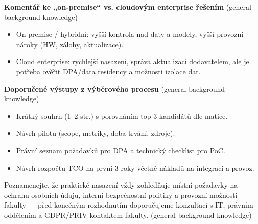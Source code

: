 \bigskip

\textbf{Komentář ke „on‑premise“ vs. cloudovým enterprise řešením} (general background knowledge)
\begin{itemize}
  \item On‑premise / hybridní: vyšší kontrola nad daty a modely, vyšší provozní nároky (HW, zálohy, aktualizace).
  \item Cloud enterprise: rychlejší nasazení, správa aktualizací dodavatelem, ale je potřeba ověřit DPA/data residency a možnosti izolace dat.
\end{itemize}

\bigskip

\textbf{Doporučené výstupy z výběrového procesu} (general background knowledge)
\begin{itemize}
  \item Krátký souhrn (1–2 str.) s porovnáním top‑3 kandidátů dle matice.
  \item Návrh pilotu (scope, metriky, doba trvání, zdroje).
  \item Právní seznam požadavků pro DPA a technický checklist pro PoC.
  \item Návrh rozpočtu TCO na první 3 roky včetně nákladů na integraci a provoz.
\end{itemize}

\bigskip

Poznamenejte, že praktické nasazení vždy zohledňuje místní požadavky na ochranu osobních údajů, interní bezpečnostní politiky a provozní možnosti fakulty — před konečným rozhodnutím doporučujeme konzultaci s IT, právním oddělením a GDPR/PRIV kontaktem fakulty. (general background knowledge)